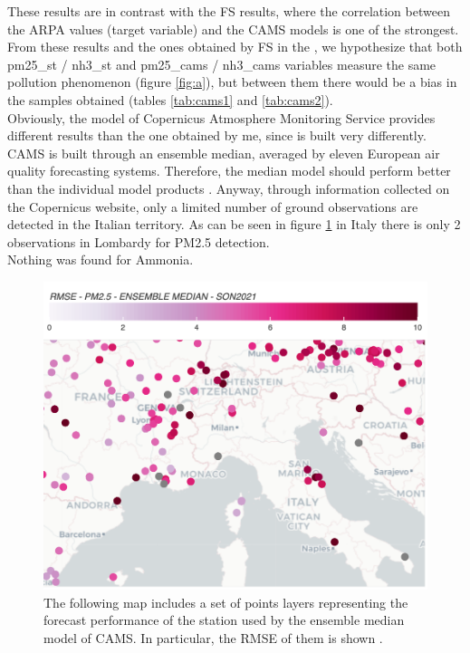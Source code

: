 These results are in contrast with the FS results, where the correlation between the ARPA values (target variable) and the CAMS models is one of the strongest.
From these results and the ones obtained by FS in the , we hypothesize that both pm25\_st / nh3\_st and pm25\_cams / nh3\_cams variables measure the same pollution phenomenon (figure \ref{fig:a}), but between them there would be a bias in the samples obtained (tables \ref{tab:cams1} and \ref{tab:cams2}).\\
Obviously, the model of Copernicus Atmosphere Monitoring Service provides different results than the one obtained by me, since is built very differently. CAMS is built through an ensemble median, averaged by eleven European air quality forecasting systems. Therefore, the median model should perform better than the individual model products \cite{riccio2007seeking}.
Anyway, through information collected on the Copernicus website, only a limited number of ground observations are detected in the Italian territory. As can be seen in figure \ref{fig:cams} in Italy there is only 2 observations in Lombardy for PM2.5 detection.\\
Nothing was found for Ammonia.
\begin{figure}[H]
    \centering
    \includegraphics[scale=0.2]{images/cams_obs.png}
    \caption{The following map includes a set of points layers representing the forecast performance of the station used by the ensemble median model of CAMS. In particular, the RMSE of them is shown \cite{camsobs}. 
}
    \label{fig:cams}
\end{figure}

